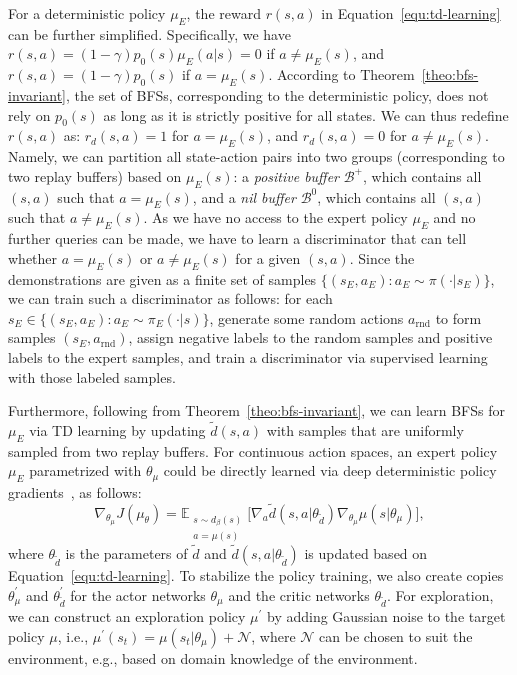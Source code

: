\documentclass[letterpaper]{article} %
\begin{document}
For a deterministic policy $\mu_E$, the reward $r(s, a)$ in Equation~\eqref{equ:td-learning} can be further simplified.
Specifically, we have $r(s, a) = (1-\gamma) p_0(s)\mu_E(a|s) = 0$ if $a\neq\mu_E(s)$,
and $r(s, a)= (1-\gamma) p_0(s)$ if $a=\mu_E(s)$.
According to Theorem~\ref{theo:bfs-invariant},
the set of BFSs, corresponding to the deterministic policy,
does not rely on $p_0(s)$ as long as it is strictly positive for all states.
We can thus redefine $r(s, a)$  as:
$r_d(s, a) = 1$ for $a=\mu_E(s)$, and $r_d(s, a)=0$ for $a\neq\mu_E(s)$.
Namely, we can partition all state-action pairs into two groups (corresponding to two replay buffers) based on $\mu_E(s)$:
a \textit{positive buffer} $\mathcal{B}^{+}$, which contains all $(s, a)$ such that $a=\mu_E(s)$,
and a \textit{nil buffer} $\mathcal{B}^{0}$, which contains all $(s, a)$ such that $a\neq\mu_E(s)$.
As we have no access to the expert policy $\mu_E$ and no further queries can be made,
we have to learn a discriminator that can tell whether $a=\mu_E(s)$ or $a\neq\mu_E(s)$ for a given $(s, a)$.
Since the demonstrations are given as a finite set of samples $\{(s_E, a_E): a_E\sim\pi(\cdot|s_E)\}$,
we can  train such a discriminator as follows:
for each $s_E \in \{(s_E, a_E): a_E\sim\pi_E(\cdot|s)\}$, generate some random actions $a_{\text{rnd}}$ to form samples $(s_E, a_{\text{rnd}})$,
assign negative labels to the random samples and positive labels to the expert samples,
and train a discriminator via supervised learning with those labeled samples.



Furthermore, following from Theorem~\ref{theo:bfs-invariant},
we can learn BFSs for $\mu_E$ via TD learning by updating $\tilde{d}(s, a)$ with samples that are uniformly sampled from two replay buffers.
For continuous action spaces, an expert policy $\mu_{E}$ parametrized with $\theta_{\mu}$ could be directly learned via deep deterministic policy gradients~\cite{lillicrap2015continuous},
as follows:
\begin{equation}\label{equ:deterministic-update}
\nabla_{\theta_\mu}J(\mu_{\theta}) = \mathbb{E}_{\substack{s\sim d_{\beta}(s) \\a=\mu(s)}}\big[ \nabla_a \tilde{d}(s, a|\theta_{\tilde{d}})\nabla_{\theta_\mu}\mu(s|\theta_\mu)  \big],
\end{equation}
where $\theta_{\tilde{d}}$ is the parameters of $\tilde{d}$ and $\tilde{d}(s, a|\theta_{\tilde{d}})$ is updated based on Equation~\eqref{equ:td-learning}.
To stabilize the policy training, we also create copies $\theta_\mu^\prime$ and $\theta_{\tilde{d}}^\prime$ for the actor networks $\theta_{\mu}$ and the critic networks $\theta_{\tilde{d}}$.
For exploration, we can construct an exploration policy $\mu^\prime$ by adding Gaussian noise to the target policy $\mu$,
i.e., $\mu^\prime(s_t) = \mu(s_t|\theta_\mu) + \mathcal{N}$,
where $\mathcal{N}$ can be chosen to suit the environment,
e.g., based on domain knowledge of the environment.
\end{document}
